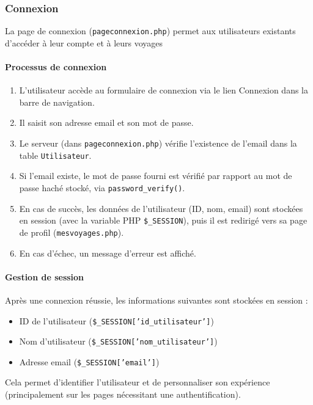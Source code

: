 \documentclass[a4paper,12pt]{article}
\begin{document}
\subsubsection{Connexion}

La page de connexion (\texttt{pageconnexion.php}) permet aux utilisateurs existants d'accéder à leur compte et à leurs voyages

\paragraph{Processus de connexion}

\begin{enumerate}
  \item L'utilisateur accède au formulaire de connexion via le lien \og Connexion \fg{} dans la barre de navigation.
  \item Il saisit son adresse email et son mot de passe.
  \item Le serveur (dans \texttt{pageconnexion.php}) vérifie l'existence de l'email dans la table \texttt{Utilisateur}.
  \item Si l'email existe, le mot de passe fourni est vérifié par rapport au mot de passe haché stocké, via \texttt{password\_verify()}.
  \item En cas de succès, les données de l’utilisateur (ID, nom, email) sont stockées en session (avec la variable PHP \texttt{\$\_SESSION}), puis il est redirigé vers sa page de profil (\texttt{mesvoyages.php}).
  \item En cas d’échec, un message d’erreur est affiché.
\end{enumerate}

\paragraph{Gestion de session}

Après une connexion réussie, les informations suivantes sont stockées en session :
\begin{itemize}
  \item ID de l'utilisateur (\texttt{\$\_SESSION['id\_utilisateur']})
  \item Nom d'utilisateur (\texttt{\$\_SESSION['nom\_utilisateur']})
  \item Adresse email (\texttt{\$\_SESSION['email']})
\end{itemize}

Cela permet d’identifier l’utilisateur et de personnaliser son expérience (principalement sur les pages nécessitant une authentification).
\end{document}
